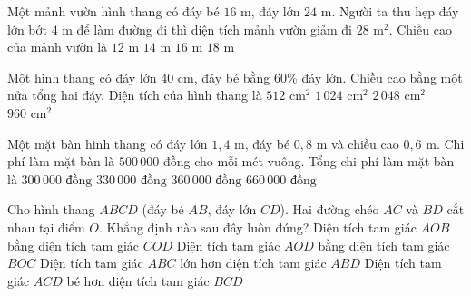\begin{ex} %
Một mảnh vườn hình thang có đáy bé $16\text{ m}$, đáy lớn $24\text{ m}$. Người ta thu hẹp đáy lớn bớt $4\text{ m}$ để làm đường đi thì diện tích mảnh vườn giảm đi $28\text{ m}^2$. Chiều cao của mảnh vườn là
\choice
{$12\text{ m}$}
{\True $14\text{ m}$}
{$16\text{ m}$}
{$18\text{ m}$}
\end{ex}

\begin{ex} %
Một hình thang có đáy lớn $40\text{ cm}$, đáy bé bằng $60\%$ đáy lớn. Chiều cao bằng một nửa tổng hai đáy. Diện tích của hình thang là
\choice
{$512\text{ cm}^2$}
{\True $1\,024\text{ cm}^2$}
{$2\,048\text{ cm}^2$}
{$960\text{ cm}^2$}
\end{ex}

\begin{ex} %
Một mặt bàn hình thang có đáy lớn $1{,}4\text{ m}$, đáy bé $0{,}8\text{ m}$ và chiều cao $0{,}6\text{ m}$. Chi phí làm mặt bàn là $500\,000$ đồng cho mỗi mét vuông. Tổng chi phí làm mặt bàn là
\choice
{$300\,000\text{ đồng}$}
{\True $330\,000\text{ đồng}$}
{$360\,000\text{ đồng}$}
{$660\,000\text{ đồng}$}
\end{ex}

\begin{ex} %
Cho hình thang $ABCD$ (đáy bé $AB$, đáy lớn $CD$). Hai đường chéo $AC$ và $BD$ cắt nhau tại điểm $O$. Khẳng định nào sau đây luôn đúng?
\choice
{Diện tích tam giác $AOB$ bằng diện tích tam giác $COD$}
{\True Diện tích tam giác $AOD$ bằng diện tích tam giác $BOC$}
{Diện tích tam giác $ABC$ lớn hơn diện tích tam giác $ABD$}
{Diện tích tam giác $ACD$ bé hơn diện tích tam giác $BCD$}
\end{ex}

